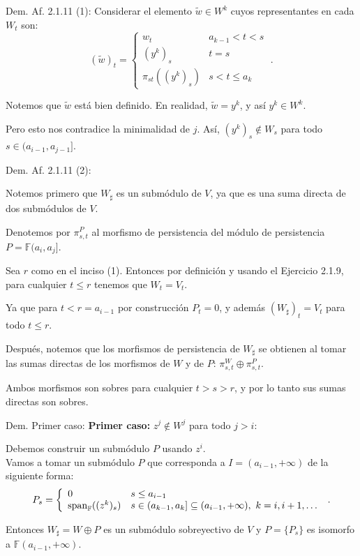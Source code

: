 \documentclass{beamer}
\newcounter{Ejercicio}
\newcommand{\til}{\tilde}
\def\F {\mathbb{F}}
\begin{document}
\begin{frame}{Dem. Af. 2.1.11 (1):}
Considerar el elemento $\til w \in W^k$ cuyos representantes en cada $W_t$ son:
$$
	(\til w)_t = \left\{
	\begin{array}{ll}
	w_t  					& a_{k-1} < t < s  \\
	(y^k)_s 	& t=s \\
	\pi_{st} ((y^k)_s) & s < t \leq a_{k}
	\end{array}
	\right. \;.
$$

Notemos que $\tilde{w}$ está bien definido. En realidad, $\til w = y^k$, y así $y^k \in W^k$. \pause

Pero esto nos contradice la minimalidad de $j$. Así, $(y^k)_s \notin W_s$ para todo $s\in (a_{i-1}, a_{j-1}]$.
\end{frame}

\begin{frame}{Dem. Af. 2.1.11 (2):}

Notemos primero que $W_\sharp$ es un submódulo de $V$, ya que es una suma directa de dos submódulos de $V$. \\[0.2cm]\pause

Denotemos por $\pi_{s,t}^{P}$ al morfismo de persistencia del módulo de persistencia $P = \F(a_i, a_j]$.\\[0.2cm]\pause

Sea $r$ como en el inciso (1). Entonces por definición y usando el Ejercicio 2.1.9, para cualquier $t\leq r$ tenemos que $W_t = V_t$. \\ \pause

Ya que para $t<r=a_{i-1}$ por construcción $P_t=0$, y además $(W_\sharp)_t=V_t$ para todo $t\leq r$.\\[0.2cm] \pause

Después, notemos que los morfismos de persistencia de $W_{\sharp}$ se obtienen al tomar las sumas directas de los morfismos de $W$ y de $P$: $\pi_{s,t}^{W} \oplus \pi_{s,t}^{P}$. \pause

Ambos morfismos son sobres para cualquier $t>s>r$, y por lo tanto sus sumas directas son sobres.    

\end{frame}

\begin{frame}{Dem. Primer caso:}
\textbf{Primer caso: }$z^j \notin W^j$ para todo $j > i$:\\ \pause

Debemos construir un submódulo $P$ usando $z^i$. \\
\pause
Vamos a tomar un submódulo $P$ que corresponda a $I = (a_{i-1}, +\infty)$  de la siguiente forma: 
$$
P_s = \left\{
\begin{array}{ll}
0  					& s \leq a_{i-1}  \\
\spn_{\F}((z^k)_s) 	& s \in (a_{k-1}, a_{k}] \subseteq (a_{i-1}, +\infty),\ k= i, i+1, \ldots
\end{array}
\right. \;.
$$

\pause
Entonces $W_{\sharp} = W \oplus P$ es un submódulo sobreyectivo de $V$ y $P = \{P_s\}$ es isomorfo a $\F (a_{i-1}, +\infty)$. 
\end{frame}
\end{document}
